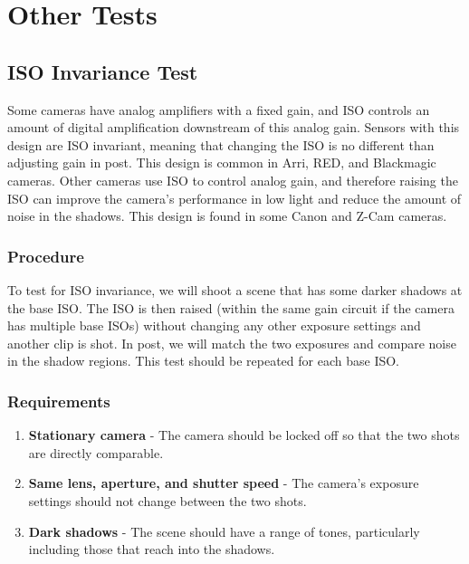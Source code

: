 \documentclass[twoside]{article}
\begin{document}

\section{Other Tests}

\subsection{ISO Invariance Test}
Some cameras have analog amplifiers with a fixed gain, and ISO controls an amount of digital amplification downstream of this analog gain. Sensors with this design are ISO invariant, meaning that changing the ISO is no different than adjusting gain in post. This design is common in Arri, RED, and Blackmagic cameras. Other cameras use ISO to control analog gain, and therefore raising the ISO can improve the camera's performance in low light and reduce the amount of noise in the shadows. This design is found in some Canon and Z-Cam cameras. \\

\subsubsection{Procedure}
To test for ISO invariance, we will shoot a scene that has some darker shadows at the base ISO. The ISO is then raised (within the same gain circuit if the camera has multiple base ISOs) without changing any other exposure settings and another clip is shot. In post, we will match the two exposures and compare noise in the shadow regions. This test should be repeated for each base ISO.

\subsubsection{Requirements}
\begin{enumerate}
    \item \textbf{Stationary camera} - The camera should be locked off so that the two shots are directly comparable.
    \item \textbf{Same lens, aperture, and shutter speed} - The camera's exposure settings should not change between the two shots.
    \item \textbf{Dark shadows} - The scene should have a range of tones, particularly including those that reach into the shadows.
\end{enumerate}
\end{document}
